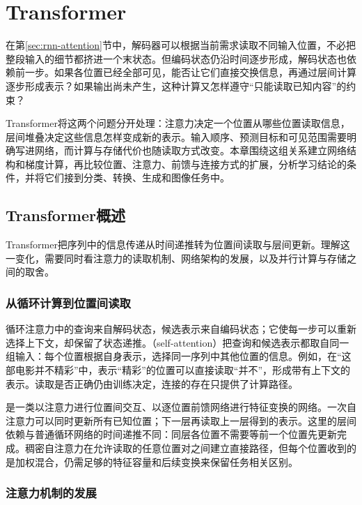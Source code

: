 \chapter{Transformer}
\label{chap:transformer}

在第\ref{sec:rnn-attention}节中，解码器可以根据当前需求读取不同输入位置，不必把整段输入的细节都挤进一个末状态。但编码状态仍沿时间逐步形成，解码状态也依赖前一步。如果各位置已经全部可见，能否让它们直接交换信息，再通过层间计算逐步形成表示？如果输出尚未产生，这种计算又怎样遵守“只能读取已知内容”的约束？

Transformer将这两个问题分开处理：注意力决定一个位置从哪些位置读取信息，层间堆叠决定这些信息怎样变成新的表示。输入顺序、预测目标和可见范围需要明确写进网络，而计算与存储代价也随读取方式改变。本章围绕这组关系建立网络结构和梯度计算，再比较位置、注意力、前馈与连接方式的扩展，分析学习结论的条件，并将它们接到分类、转换、生成和图像任务中。

\section{Transformer概述}
\label{sec:transformer-overview}

Transformer把序列中的信息传递从时间递推转为位置间读取与层间更新。理解这一变化，需要同时看注意力的读取机制、网络架构的发展，以及并行计算与存储之间的取舍。

\subsection{从循环计算到位置间读取}
\label{sec:transformer-core-idea}

循环注意力中的查询来自解码状态，候选表示来自编码状态；它使每一步可以重新选择上下文，却保留了状态递推。（self-attention）把查询和候选表示都取自同一组输入：每个位置根据自身表示，选择同一序列中其他位置的信息。例如，在“这部电影并不精彩”中，表示“精彩”的位置可以直接读取“并不”，形成带有上下文的表示。读取是否正确仍由训练决定，连接的存在只提供了计算路径。

是一类以注意力进行位置间交互、以逐位置前馈网络进行特征变换的网络。一次自注意力可以同时更新所有已知位置；下一层再读取上一层得到的表示。这里的层间依赖与普通循环网络的时间递推不同：同层各位置不需要等前一个位置先更新完成。稠密自注意力在允许读取的任意位置对之间建立直接路径，但每个位置收到的是加权混合，仍需足够的特征容量和后续变换来保留任务相关区别。

\subsection{注意力机制的发展}
\label{sec:transformer-attention-history}

